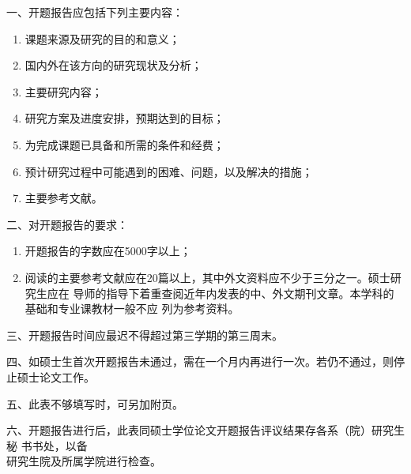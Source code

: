 {%
\newpage
\thispagestyle{empty}
\vspace*{44pt}
\begin{center}
  {\hei\sanhao {}}
\end{center}
\vspace*{40pt}
    {\song\renewcommand{}
    \fontsize{10.5pt}{12.6pt}\selectfont
    \noindent 一、开题报告应包括下列主要内容：
    \begin{enumerate}[leftmargin=36pt,itemindent=-2pt,itemsep=0ex,listparindent=21.8pt,partopsep=0pt,parsep=0.5ex,topsep=-0ex]
    \item 课题来源及研究的目的和意义；
    \item 国内外在该方向的研究现状及分析；
    \item 主要研究内容；
    \item 研究方案及进度安排，预期达到的目标；
    \item 为完成课题已具备和所需的条件和经费；
    \item 预计研究过程中可能遇到的困难、问题，以及解决的措施；
    \item 主要参考文献。
    \end{enumerate}
    \noindent 二、对开题报告的要求：
   \begin{enumerate}[leftmargin=36pt,itemindent=-2pt,itemsep=0ex,listparindent=21.8pt,partopsep=0pt,parsep=0.5ex,topsep=-0ex]
    \item 开题报告的字数应在5000字以上；
    \item 阅读的主要参考文献应在20篇以上，其中外文资料应不少于三分之一。硕士研究生应在
    导师的指导下着重查阅近年内发表的中、外文期刊文章。本学科的基础和专业课教材一般不应
    列为参考资料。
    \end{enumerate}
    \noindent 三、开题报告时间应最迟不得超过第三学期的第三周末。

    \noindent 四、\hspace{-1.5pt}如硕士生首次开题报告未通过，\hspace{-1.5pt}需在一个月内再进行一次。\hspace{-1.5pt}若仍不通过，\hspace{-1.5pt}则停止硕士论文工作。

    \noindent 五、此表不够填写时，可另加附页。

    \noindent 六、开题报告进行后，此表同硕士学位论文开题报告评议结果存各系（院）研究生秘
    书书处，以备\\\hspace*{20.6pt}研究生院及所属学院进行检查。
    }
    \clearpage
    \ifoneortwoside
    \else
    \fi
}
\fi
\makeatother
